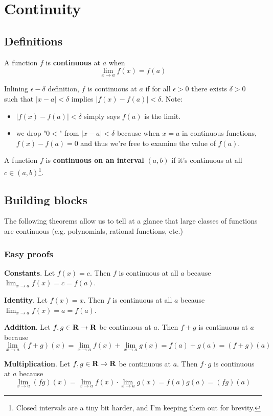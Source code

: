 \section{Continuity}

\subsection{Definitions}

A function $f$ is \textbf{continuous} at $a$ when
\[\lim_{x\to a}f(x)=f(a)\]

Inlining $\epsilon-\delta$ definition, $f$ is continuous at $a$ if for all $\epsilon>0$ there exists $\delta>0$ such that $|x-a|<\delta$ implies $|f(x)-f(a)|<\delta$. Note:
\begin{itemize}
    \item $|f(x)-f(a)|<\delta$ simply says $f(a)$ is the limit.
    \item we drop "$0<$" from $|x-a|<\delta$ because when $x=a$ in continuous functions, $f(x)-f(a)=0$ and thus we're free to examine the value of $f(a)$.
\end{itemize}

A function $f$ is \textbf{continuous on an interval} $(a, b)$ if it's continuous at all $c\in(a,b)$\footnote{Closed intervals are a tiny bit harder, and I'm keeping them out for brevity.}.

\subsection{Building blocks}
The following theorems allow us to tell at a glance that large classes of functions are continuous (e.g. polynomials, rational functions, etc.)

\subsubsection{Easy proofs}
\textbf{Constants}. Let $f(x)=c$. Then $f$ is continuous at all $a$ because $\lim_{x\to a}f(x)=c=f(a)$.

\vs

\textbf{Identity}. Let $f(x)=x$. Then $f$ is continuous at all $a$ because $\lim_{x\to a}f(x)=a=f(a)$.

\vs

\textbf{Addition}. Let $f,g\in\mathbf{R}\to\mathbf{R}$ be continuous at $a$. Then $f+g$ is continuous at $a$ because
\[\lim_{x\to a}(f+g)(x)=\lim_{x\to a}f(x)+\lim_{x\to a}g(x)=f(a)+g(a)=(f+g)(a)\]

\textbf{Multiplication}. Let $f,g\in\mathbf{R}\to\mathbf{R}$ be continuous at $a$. Then $f\cdot g$ is continuous at $a$ because
\[\lim_{x\to a}(fg)(x)=\lim_{x\to a}f(x)\cdot\lim_{x\to a}g(x)=f(a)g(a)=(fg)(a)\]

